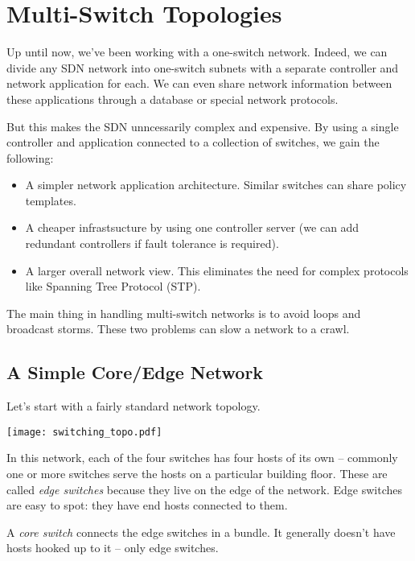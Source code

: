 
\chapter{Multi-Switch Topologies}
 \label{multiswitch_topologies}

Up until now, we've been working with a one-switch network.  Indeed, we can divide any SDN network into
one-switch subnets with a separate controller and network application for each.  We can even share
network information between these applications through a database or special network protocols.  

But this makes the SDN unncessarily complex and expensive.  By using a single controller and application
connected to a collection of switches, we gain the following:

\begin{itemize}
\item A simpler network application architecture.  Similar switches can share policy templates.
\item A cheaper infrastsucture by using one controller server (we can add redundant controllers if
fault tolerance is required).
\item A larger overall network view.  This eliminates the need for complex protocols like Spanning
Tree Protocol (STP).
\end{itemize}

The main thing in handling multi-switch networks is to avoid loops and broadcast storms.  These two 
problems can slow a network to a crawl.   

\section{A Simple Core/Edge Network}

Let's start with a fairly standard network topology.  

\texttt{[image: switching\_topo.pdf]}

In this network, each of the four switches 
has four hosts of its own -- commonly one or more switches serve the hosts on a particular building floor.
These are called \emph{edge switches} because they live on the edge of the network.  Edge switches are easy to 
spot: they have end hosts connected to them.

A \emph{core switch} connects the edge switches in a bundle.  It generally doesn't have hosts
hooked up to it -- only edge switches.  

